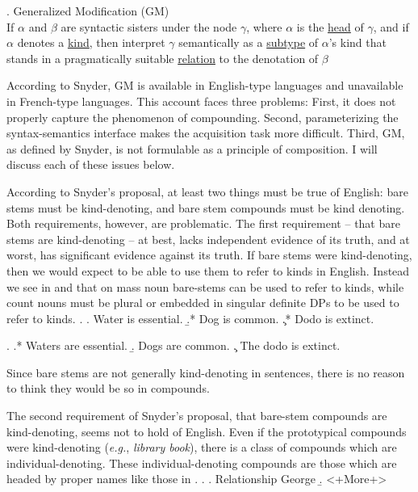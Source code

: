 \documentclass[MilwayThesis]{subfiles}
\begin{document}
\ex. Generalized Modification (GM)\\
If $\alpha$ and $\beta$ are syntactic sisters under the node $\gamma$, where $\alpha$ is the \uline{head} of $\gamma$, and if $\alpha$ denotes a \uline{kind}, then interpret $\gamma$ semantically as a \uline{subtype} of $\alpha$'s kind that stands in a pragmatically suitable \uline{relation} to the denotation of $\beta$

According to Snyder, GM is available in English-type languages and unavailable in French-type languages.
This account faces three problems:
First, it does not properly capture the phenomenon of compounding.
Second, parameterizing the syntax-semantics interface makes the acquisition task more difficult.
Third, GM, as defined by Snyder, is not formulable as a principle of composition.
I will discuss each of these issues below.

According to Snyder's proposal, at least two things must be true of English: bare stems must be kind-denoting, and bare stem compounds must be kind denoting.
Both requirements, however, are problematic.
The first requirement -- that bare stems are kind-denoting -- at best, lacks independent evidence of its truth, and at worst, has significant evidence against its truth.
If bare stems were kind-denoting, then we would expect to be able to use them to refer to kinds in English.
Instead we see in \Next and \NNext that on mass noun bare-stems can be used to refer to kinds, while count nouns must be plural or embedded in singular definite DPs to be used to refer to kinds.
\ex.
\a. Water is essential.
\b.* Dog is common.
\c.* Dodo is extinct.

\ex.
\a.* Waters are essential.
\b. Dogs are common.
\c. The dodo is extinct.\\

Since bare stems are not generally kind-denoting in sentences, there is no reason to think they would be so in compounds.

The second requirement of Snyder's proposal, that bare-stem compounds are kind-denoting, seems not to hold of English.
Even if the prototypical compounds were kind-denoting (\textit{e.g.}, \textit{library book}), there is a class of compounds which are individual-denoting.
These individual-denoting compounds are those which are headed by proper names like those in \Next.
\ex.
\a. Relationship George
\b. <+More+>
\end{document}
